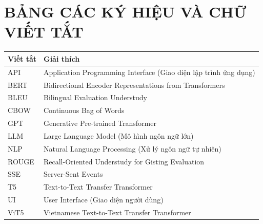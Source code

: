 \chapter*{BẢNG CÁC KÝ HIỆU VÀ CHỮ VIẾT TẮT}

\begin{longtable}{l p{12cm}}
\toprule
\textbf{Viết tắt} & \textbf{Giải thích} \\
\midrule
\endfirsthead

API & Application Programming Interface (Giao diện lập trình ứng dụng) \\
BERT & Bidirectional Encoder Representations from Transformers \\
BLEU & Bilingual Evaluation Understudy \\
CBOW & Continuous Bag of Words \\
GPT & Generative Pre-trained Transformer \\
LLM & Large Language Model (Mô hình ngôn ngữ lớn) \\
NLP & Natural Language Processing (Xử lý ngôn ngữ tự nhiên) \\
ROUGE & Recall-Oriented Understudy for Gisting Evaluation \\
SSE & Server-Sent Events \\
T5 & Text-to-Text Transfer Transformer \\
UI & User Interface (Giao diện người dùng) \\
ViT5 & Vietnamese Text-to-Text Transfer Transformer \\

\bottomrule
\end{longtable}
